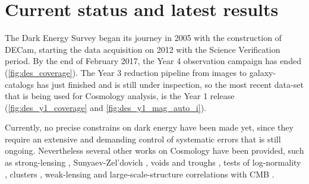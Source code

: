 \section{Current status and latest results}
The Dark Energy Survey began its journey in 2005 with the construction of DECam, starting the data acquisition on 2012 with the Science Verification period. By the end of February 2017, the Year 4 observation campaign has ended (\autoref{fig:des_coverage}). The Year 3 reduction pipeline from images to galaxy-catalogs has just finished and is still under inspection, so the most recent data-set that is being used for Cosmology analysis, is the Year 1 release (\autoref{fig:des_y1_coverage} and \autoref{fig:des_y1_mag_auto_i}).
\newline

Currently, no precise constrains on dark energy have been made yet, since they require an extensive and demanding control of systematic errors that is still ongoing. Nevertheless several other works on Cosmology have been provided, such as strong-lensing \cite{2015MNRAS.454.1260A,2016ApJ...827...51N,2017ApJ...838L..15L}, Sunyaev-Zel'dovich \cite{2016arXiv160508770S}, voids and troughs \cite{2016MNRAS.455.3367G,2017MNRAS.465..746S}, tests of log-normality \cite{2017MNRAS.466.1444C}, clusters \cite{2017MNRAS.467.4015H}, weak-lensing \cite{2015PhRvD..92b2006V,2016PhRvD..94b2002B,2016MNRAS.459...21K,2016MNRAS.461.3172S,2016MNRAS.461.4099B,2016arXiv160908167P,2017MNRAS.465.4204C} and large-scale-structure correlations with CMB \cite{2016MNRAS.456.3213G,2016MNRAS.459...21K,2017MNRAS.465.4166K}.
\newline

